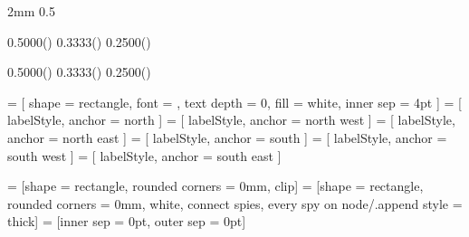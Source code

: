 
\usepackage{calc}
\usepackage{tikz}
\usetikzlibrary{calc,positioning,spy,shapes}


\newlength{\pfull}  \setlength{\pfull}  {2mm}
\newlength{\phalf}  \setlength{\phalf}  {0.5\pfull}

\newlength{\lwffp}   \setlength{\lwffp}   {0.5000\dimexpr(\pfull)}
\newlength{\lwfffp}  \setlength{\lwfffp}  {0.3333\dimexpr(\pfull)}
\newlength{\lwffffp} \setlength{\lwffffp} {0.2500\dimexpr(\pfull)}
\newlength{\lwfffffp}\setlength{\lwfffffp}{0.2000\dimexpr(\linewidth-4.0\pfull)}

\newlength{\twffp}   \setlength{\twffp}   {0.5000\dimexpr(\pfull)}
\newlength{\twfffp}  \setlength{\twfffp}  {0.3333\dimexpr(\pfull)}
\newlength{\twffffp} \setlength{\twffffp} {0.2500\dimexpr(\pfull)}
\newlength{\twfffffp}\setlength{\twfffffp}{0.2000\dimexpr(\textwidth-4.0\pfull)}

 = [ shape = rectangle, font = \footnotesize, text depth = 0, fill = white, inner sep = 4pt ]
  = [ labelStyle, anchor = north ]
 = [ labelStyle, anchor = north west ]
 = [ labelStyle, anchor = north east ]
  = [ labelStyle, anchor = south ]
 = [ labelStyle, anchor = south west ]
 = [ labelStyle, anchor = south east ]

 = [shape = rectangle, rounded corners = 0mm, clip] %
 = [shape = rectangle, rounded corners = 0mm, %
    white, connect spies, every spy on node/.append style = {thick}] %
 = [inner sep = 0pt, outer sep = 0pt] %

